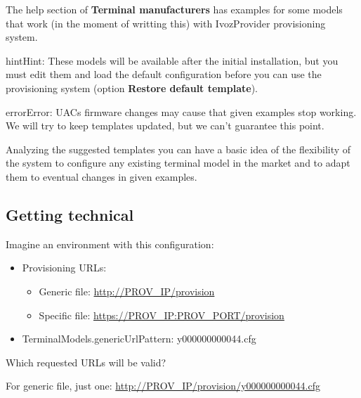 \documentclass[letterpaper,10pt,english]{sphinxmanual}
\begin{document}
The help section of \textbf{Terminal manufacturers} has examples for some models
that work (in the moment of writting this) with IvozProvider provisioning system.

\begin{notice}{hint}{Hint:}
These models will be available after the initial installation, but
you must edit them and load the default configuration before
you can use the provisioning system (option \textbf{Restore default template}).
\end{notice}

\begin{notice}{error}{Error:}
UACs firmware changes may cause that given examples stop working. We
will try to keep templates updated, but we can't guarantee this point.
\end{notice}

Analyzing the suggested templates you can have a basic idea of the flexibility of
the system to configure any existing terminal model in the market and to adapt
them to eventual changes in given examples.


\subsection{Getting technical}
\label{administration_portal/platform/terminal_manufacturers:getting-technical}
Imagine an environment with this configuration:
\begin{itemize}
\item {} 
Provisioning URLs:
\begin{itemize}
\item {} 
Generic file: \url{http://PROV\_IP/provision}

\item {} 
Specific file: \url{https://PROV\_IP:PROV\_PORT/provision}

\end{itemize}

\item {} 
TerminalModels.genericUrlPattern: y000000000044.cfg

\end{itemize}

Which requested URLs will be valid?

For generic file, just one: \url{http://PROV\_IP/provision/y000000000044.cfg}
\end{document}
